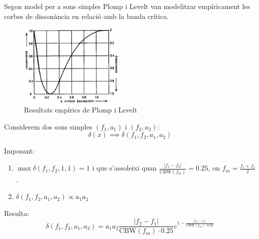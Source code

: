 \documentclass[10pt,hyperref={colorlinks,linkcolor=black,citecolor=blue!80,urlcolor=blue!60},handout]{beamer} %
\theoremstyle{definition}
\begin{document}
\begin{frame}{Segon model per a sons simples}
    Plomp i Levelt \cite{plomp} van modelitzar empíricament les corbes de dissonància en relació amb la banda crítica.
    \begin{figure}
        \centering
        \includegraphics[width=5cm,angle=-0.1]{Imatges_beamer2/plompt-levelt.png}
        \caption{Resultats empírics de Plomp i Levelt \cite{plomp}}
    \end{figure}
    \hypersetup{citecolor=black!30}
    \hypersetup{citecolor=blue!80}
\end{frame}
\begin{frame}
    Considerem dos sons simples $(f_1,a_1)$ i $(f_2,a_2)$:\pause
    $$\delta(x)\implies\delta(f_1,f_2,a_1,a_2)$$\par\pause
    Imposant:
    \begin{enumerate}
        \item $\max\delta(f_1,f_2,1,1)=1$ i que s'assoleixi quan $\frac{|f_1-f_2|}{\text{CBW}(f_m)}=0.25$, on $f_m=\frac{f_1+f_2}{2}$.\pause
        \item $\delta(f_1,f_2,a_1,a_2)\propto a_1a_2$\pause
    \end{enumerate}
    Resulta:
    \begin{equation*}
        \delta(f_1,f_2,a_1,a_2)=a_1a_2\frac{|f_2-f_1|}{\text{CBW}(f_m)\cdot 0.25}e^{1-\frac{|f_2-f_1|}{\text{CBW}(f_m)\cdot 0.25}}
    \end{equation*}
    \begin{figure}
        \centering
        
    \end{figure}
\end{frame}
\end{document}
